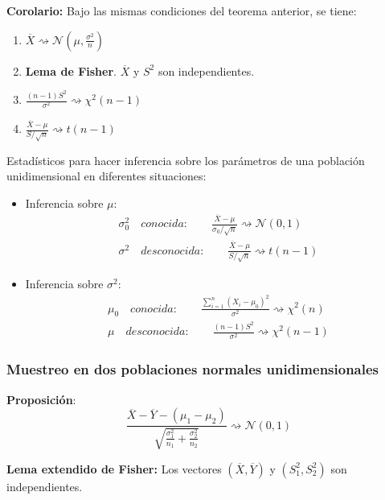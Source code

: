 \documentclass{article}
\begin{document}
\textbf{Corolario:} Bajo las mismas condiciones del teorema anterior, se tiene:
\begin{enumerate}
\item $\overline{X}\rightsquigarrow \mathcal{N}(\mu,\frac{\sigma^2}{n})$

\item \textbf{Lema de Fisher}. $\overline{X}$ y $S^2$ son independientes.

\item $\frac{(n-1)S^2}{\sigma^2}\rightsquigarrow \chi^2(n-1)$

\item $\frac{\overline{X}-\mu}{S/\sqrt{n}}\rightsquigarrow t(n-1)$
\end{enumerate}

Estadísticos para hacer inferencia sobre los parámetros de una población unidimensional en diferentes situaciones:
\begin{itemize}
\item Inferencia sobre $\mu$:
	\begin{gather*}
	\sigma_0^2\quad conocida:\qquad \frac{\overline{X}-\mu}{\sigma_0/\sqrt{n}}\rightsquigarrow \mathcal{N}(0,1)\\
	\sigma^2\quad desconocida:\qquad \frac{\overline{X}-\mu}{S/\sqrt{n}}\rightsquigarrow t(n-1)
	\end{gather*}
	
\item Inferencia sobre $\sigma^2$:
	\begin{gather*}
	\mu_0\quad conocida:\qquad \frac{\sum_{i=1}^n(X_i-\mu_0)^2}{\sigma^2}\rightsquigarrow \chi^2(n)\\
	\mu\quad desconocida:\qquad \frac{(n-1)S^2}{\sigma^2}\rightsquigarrow \chi^2(n-1)
	\end{gather*}
\end{itemize}

\subsubsection{Muestreo en dos poblaciones normales unidimensionales}
\textbf{Proposición}:
\begin{equation*}
\frac{\overline{X}-\overline{Y}-(\mu_1-\mu_2)}{\sqrt{\frac{\sigma_1^2}{n_1}+\frac{\sigma_2^2}{n_2}}}\rightsquigarrow \mathcal{N}(0,1)
\end{equation*}

\textbf{Lema extendido de Fisher:} Los vectores $(\overline{X},\overline{Y})$ y $(S_1^2,S_2^2)$ son independientes.\\
\end{document}
